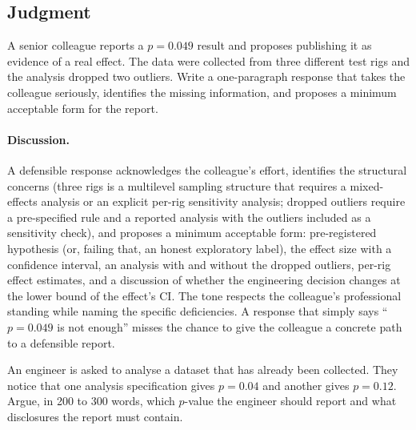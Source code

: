 \subsection*{Judgment}

\begin{exercise}
A senior colleague reports a $p = 0.049$ result and proposes
publishing it as evidence of a real effect. The data were collected
from three different test rigs and the analysis dropped two
outliers. Write a one-paragraph response that takes the colleague
seriously, identifies the missing information, and proposes a
minimum acceptable form for the report.
\end{exercise}

\paragraph{Discussion.}
A defensible response acknowledges the colleague's effort,
identifies the structural concerns (three rigs is a multilevel
sampling structure that requires a mixed-effects analysis or an
explicit per-rig sensitivity analysis; dropped outliers require a
pre-specified rule and a reported analysis with the outliers
included as a sensitivity check), and proposes a minimum
acceptable form: pre-registered hypothesis (or, failing that, an
honest exploratory label), the effect size with a confidence
interval, an analysis with and without the dropped outliers,
per-rig effect estimates, and a discussion of whether the
engineering decision changes at the lower bound of the effect's CI.
The tone respects the colleague's professional standing while
naming the specific deficiencies. A response that simply says
``$p = 0.049$ is not enough'' misses the chance to give the
colleague a concrete path to a defensible report.

\begin{exercise}
An engineer is asked to analyse a dataset that has already been
collected. They notice that one analysis specification gives
$p = 0.04$ and another gives $p = 0.12$. Argue, in 200 to 300
words, which $p$-value the engineer should report and what
disclosures the report must contain.
\end{exercise}

